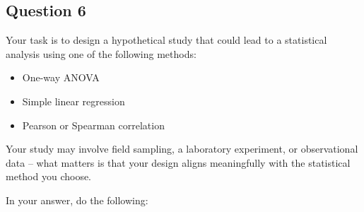 \documentclass[
  10t,
]{article}
\providecommand{\tightlist}{%
  \setlength{\itemsep}{0pt}\setlength{\parskip}{0pt}}
\begin{document}
\subsection{Question 6}\label{question-6}

Your task is to design a hypothetical study that could lead to a
statistical analysis using one of the following methods:

\begin{itemize}
\tightlist
\item
  One-way ANOVA
\item
  Simple linear regression
\item
  Pearson or Spearman correlation
\end{itemize}

Your study may involve field sampling, a laboratory experiment, or
observational data -- what matters is that your design aligns
meaningfully with the statistical method you choose.

In your answer, do the following:
\end{document}
